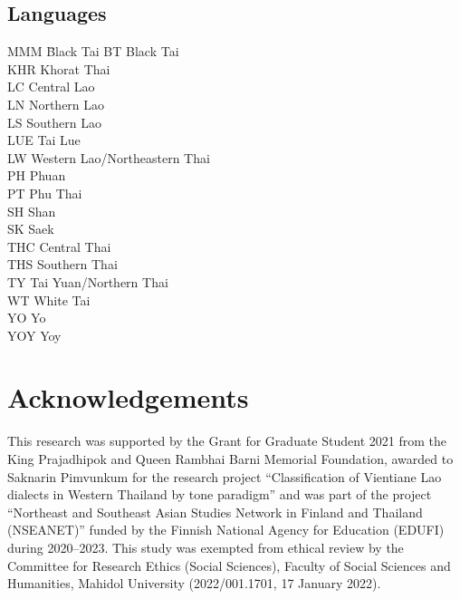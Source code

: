 \documentclass[output=paper]{langscibook}
\begin{document}
\subsection*{Languages}
\begin{multicols}{2}
\begin{tabbing}
MMM \= Black Tai\kill
BT \> Black Tai\\
KHR \> Khorat Thai\\
LC \> Central Lao\\
LN \> Northern Lao\\
LS \> Southern Lao\\
LUE \> Tai Lue\\
LW \> Western Lao\slash Northeastern Thai\\
PH \> Phuan\\
PT \> Phu Thai\\
SH \> Shan\\
SK \> Saek\\
THC \> Central Thai\\
THS \> Southern Thai\\
TY \> Tai Yuan\slash Northern Thai\\
WT \> White Tai\\
YO \> Yo\\
YOY \> Yoy
\end{tabbing}
\end{multicols}

\section*{Acknowledgements}

This research was supported by the Grant for Graduate Student 2021 from the King Prajadhipok and Queen Rambhai Barni Memorial Foundation, awarded to Saknarin Pimvunkum for the research project
“Classification of Vientiane Lao dialects in Western Thailand by tone paradigm” and was part of the project “Northeast and Southeast Asian Studies Network in Finland and Thailand (NSEANET)” funded by the Finnish National Agency for Education (EDUFI) during 2020–2023. This study was exempted from ethical review by the Committee for Research Ethics (Social Sciences), Faculty of Social Sciences and Humanities, Mahidol University (2022/001.1701, 17 January 2022).

\printbibliography[heading=subbibliography,notkeyword=this]
\end{document}
